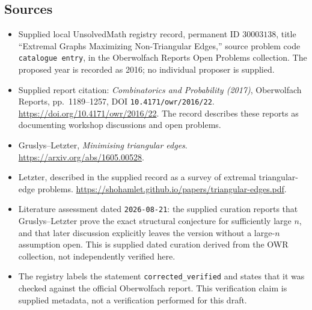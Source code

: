 \documentclass[11pt]{article}
\begin{document}
\subsection{Sources}
\begin{itemize}
\item Supplied local UnsolvedMath registry record, permanent ID \(30003138\), title ``Extremal Graphs Maximizing Non-Triangular Edges,'' source problem code \texttt{catalogue entry}, in the Oberwolfach Reports Open Problems collection. The proposed year is recorded as 2016; no individual proposer is supplied.
\item Supplied report citation: \emph{Combinatorics and Probability (2017)}, Oberwolfach Reports, pp.~1189--1257, DOI \texttt{10.4171/owr/2016/22}. \url{https://doi.org/10.4171/owr/2016/22}. The record describes these reports as documenting workshop discussions and open problems.
\item Gruslys--Letzter, \emph{Minimising triangular edges}. \url{https://arxiv.org/abs/1605.00528}.
\item Letzter, described in the supplied record as a survey of extremal triangular-edge problems. \url{https://shohamlet.github.io/papers/triangular-edges.pdf}.
\item Literature assessment dated \texttt{2026-08-21}: the supplied curation reports that Gruslys--Letzter prove the exact structural conjecture for sufficiently large \(n\), and that later discussion explicitly leaves the version without a large-\(n\) assumption open. This is supplied dated curation derived from the OWR collection, not independently verified here.
\item The registry labels the statement \texttt{corrected\_verified} and states that it was checked against the official Oberwolfach report. This verification claim is supplied metadata, not a verification performed for this draft.
\end{itemize}
\end{document}
